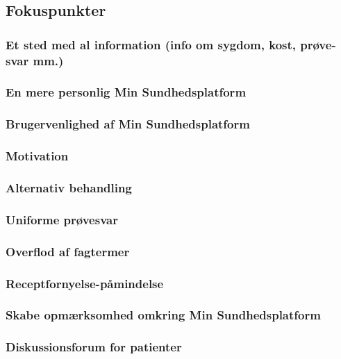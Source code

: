 \subsection{Fokuspunkter}
\subsubsection{Et sted med al information (info om sygdom, kost, prøve-svar mm.)}
\subsubsection{En mere personlig Min Sundhedsplatform}
\subsubsection{Brugervenlighed af Min Sundhedsplatform}
\subsubsection{Motivation}
\subsubsection{Alternativ behandling}
\subsubsection{Uniforme prøvesvar}
\subsubsection{Overflod af fagtermer}
\subsubsection{Receptfornyelse-påmindelse}
\subsubsection{Skabe opmærksomhed omkring Min Sundhedsplatform}
\subsubsection{Diskussionsforum for patienter}


